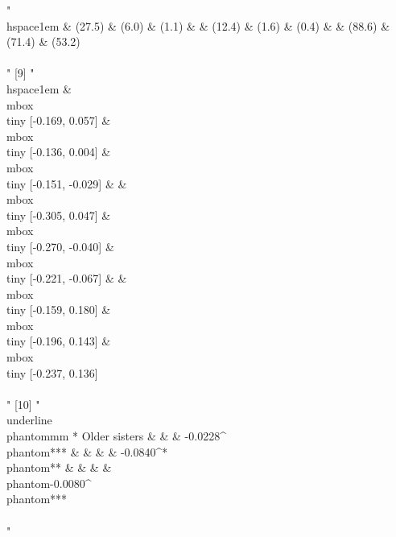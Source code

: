 \begin{Schunk}
\begin{Soutput}
 [8] "\\hspace{1em}  & (27.5) & (6.0) & (1.1) &  & (12.4) & (1.6) & (0.4) &  & (88.6) & (71.4) & (53.2)\\\\[-1ex]"                                                                                                                                                                                                                                                                                        
 [9] "\\hspace{1em}  & \\mbox{\\tiny [-0.169, 0.057]} & \\mbox{\\tiny [-0.136, 0.004]} & \\mbox{\\tiny [-0.151, -0.029]} &  & \\mbox{\\tiny [-0.305, 0.047]} & \\mbox{\\tiny [-0.270, -0.040]} & \\mbox{\\tiny [-0.221, -0.067]} &  & \\mbox{\\tiny [-0.159, 0.180]} & \\mbox{\\tiny [-0.196, 0.143]} & \\mbox{\\tiny [-0.237, 0.136]}\\\\"                                                               
[10] "\\underline{\\phantom{mm}} * Older sisters &  &  & -0.0228^{\\phantom{***}} &  &  &  & -0.0840^{*\\phantom{**}} &  &  &  & \\phantom{-}0.0080^{\\phantom{***}}\\\\[-1ex]"                                                                                                                                                                                                                           
\end{Soutput}
\end{Schunk}


